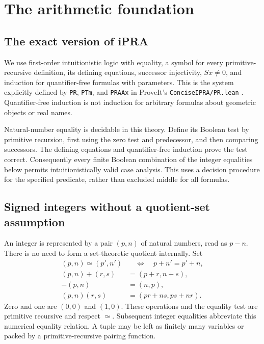 \section{The arithmetic foundation}\label{sec:arith}

\subsection{The exact version of iPRA}
We use first-order intuitionistic logic with equality, a symbol for every
primitive-recursive definition, its defining equations, successor
injectivity, $Sx\ne0$, and induction for quantifier-free formulas with
parameters. This is the system explicitly defined by
\texttt{PR}, \texttt{PTm}, and \texttt{PRAAx} in ProveIt's
\texttt{ConciseIPRA/PR.lean} \cite{repo-pr}.
Quantifier-free induction is not induction for arbitrary formulas about
geometric objects or real names.

Natural-number equality is decidable in this theory. Define its Boolean
test by primitive recursion, first using the zero test and predecessor,
and then comparing successors. The defining equations and
quantifier-free induction prove the test correct. Consequently every
finite Boolean combination of the integer equalities below permits
intuitionistically valid case analysis. This uses a decision procedure
for the specified predicate, rather than excluded middle for all formulas.

\subsection{Signed integers without a quotient-set assumption}
An integer is represented by a pair $(p,n)$ of natural numbers, read as
$p-n$. There is no need to form a set-theoretic quotient internally. Set
\begin{align*}
 (p,n)\simeq(p',n')&\quad\Longleftrightarrow\quad p+n'=p'+n,\\
 (p,n)+(r,s)&=(p+r,n+s),\\
 -(p,n)&=(n,p),\\
 (p,n)(r,s)&=(pr+ns,ps+nr).
\end{align*}
Zero and one are $(0,0)$ and $(1,0)$. These operations and the equality
test are primitive recursive and respect $\simeq$. Subsequent integer
equalities abbreviate this numerical equality relation. A tuple may be
left as finitely many variables or packed by a primitive-recursive
pairing function.


